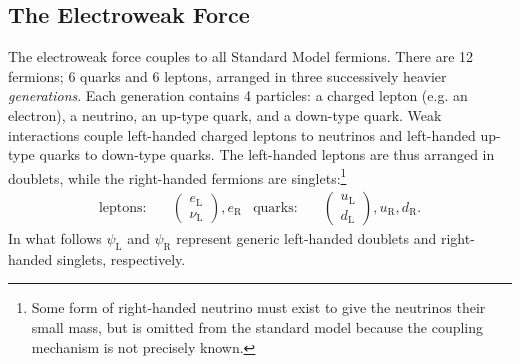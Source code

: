 \subsection{The Electroweak Force}

The electroweak force couples to all Standard Model fermions. There are 12 fermions; 6 quarks and 6 leptons, arranged in three successively heavier \emph{generations}. Each generation contains 4 particles: a charged lepton (e.g. an electron), a neutrino, an up-type quark, and a down-type quark. Weak interactions couple left-handed charged leptons to neutrinos and left-handed up-type quarks to down-type quarks. The left-handed leptons are thus arranged in doublets, while the right-handed fermions are singlets:\footnote{Some form of right-handed neutrino must exist to give the neutrinos their small mass, but is omitted from the standard model because the coupling mechanism is not precisely known.}
\begin{align}
  \text{leptons:}\quad &
  \left(\begin{matrix} e_{\mathrm{L}} \\ \nu_{\mathrm{L}} \end{matrix} \right),
  e_{\mathrm{R}}
  &
  \text{quarks:}\quad &
  \left(\begin{matrix} u_{\mathrm{L}} \\ d_{\mathrm{L}} \end{matrix} \right),
  u_{\mathrm{R}}, d_{\mathrm{R}}.
\end{align}
In what follows $\psi_{\mathrm{L}}$ and $\psi_{\mathrm{R}}$ represent generic left-handed doublets and right-handed singlets, respectively.

